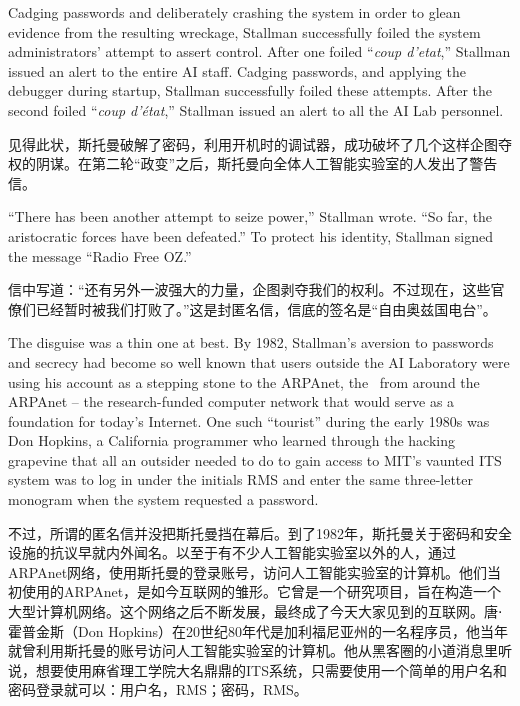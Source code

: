 \ifdefined\eng
\ifdefined\vone
Cadging passwords and deliberately crashing the system in order to glean evidence from the resulting wreckage, Stallman successfully foiled the system administrators' attempt to assert control. After one foiled ``\textit{coup d'etat},'' Stallman issued an alert to the entire AI staff.
\fi
\ifdefined\vtwo
Cadging passwords, and applying the debugger during startup, Stallman successfully foiled these attempts. After the second foiled ``\textit{coup d'état},'' Stallman issued an alert to all the AI Lab personnel.
\fi
\fi

\ifdefined\chs
见得此状，斯托曼破解了密码，利用开机时的调试器，成功破坏了几个这样企图夺权的阴谋。在第二轮``政变''之后，斯托曼向全体人工智能实验室的人发出了警告信。
\fi

\ifdefined\eng
``There has been another attempt to seize power,'' Stallman wrote. ``So far, the aristocratic forces have been defeated.'' To protect his identity, Stallman signed the message ``Radio Free OZ.''
\fi

\ifdefined\chs
信中写道：``还有另外一波强大的力量，企图剥夺我们的权利。不过现在，这些官僚们已经暂时被我们打败了。''这是封匿名信，信底的签名是``自由奥兹国电台''。
\fi

\ifdefined\eng
The disguise was a thin one at best. By 1982, Stallman's aversion to passwords and secrecy had become so well known that users outside the AI Laboratory were using his account \ifdefined\vone as a stepping stone to the ARPAnet, the \fi\ifdefined\vtwo\ from around the ARPAnet -- the \fi research-funded computer network that would serve as a foundation for today's Internet. One such ``tourist'' during the early 1980s was Don Hopkins, a California programmer who learned through the hacking grapevine that all an outsider needed to do to gain access to MIT's vaunted ITS system was to log in under the initials RMS and enter the same three-letter monogram when the system requested a password.
\fi

\ifdefined\chs
不过，所谓的匿名信并没把斯托曼挡在幕后。到了1982年，斯托曼关于密码和安全设施的抗议早就内外闻名。以至于有不少人工智能实验室以外的人，通过ARPAnet网络，使用斯托曼的登录账号，访问人工智能实验室的计算机。他们当初使用的ARPAnet，是如今互联网的雏形。它曾是一个研究项目，旨在构造一个大型计算机网络。这个网络之后不断发展，最终成了今天大家见到的互联网。唐⋅霍普金斯（Don Hopkins）在20世纪80年代是加利福尼亚州的一名程序员，他当年就曾利用斯托曼的账号访问人工智能实验室的计算机。他从黑客圈的小道消息里听说，想要使用麻省理工学院大名鼎鼎的ITS系统，只需要使用一个简单的用户名和密码登录就可以：用户名，RMS；密码，RMS。
\fi

